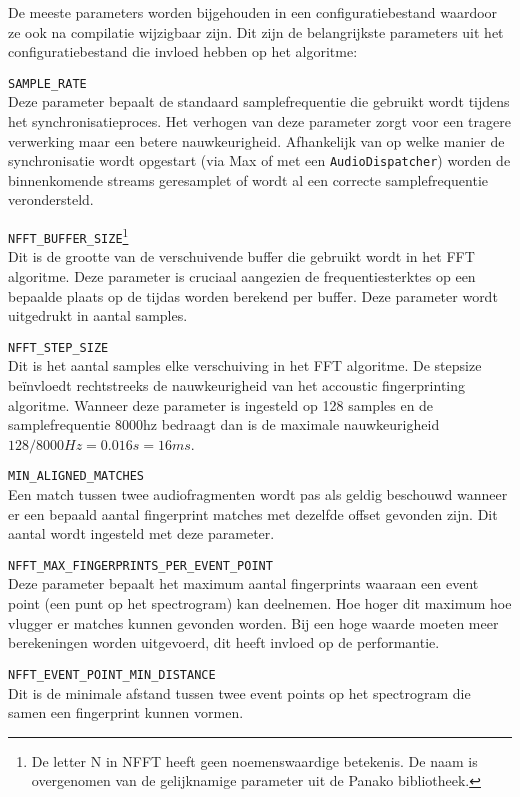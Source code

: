 De meeste parameters worden bijgehouden in een configuratiebestand waardoor ze ook na compilatie wijzigbaar zijn. Dit zijn de belangrijkste parameters uit het configuratiebestand die invloed hebben op het algoritme:

\begin{description}
\item\texttt{SAMPLE\_RATE} \hfill \\
Deze parameter bepaalt de standaard samplefrequentie die gebruikt wordt tijdens het synchronisatieproces. Het verhogen van deze parameter zorgt voor een tragere verwerking maar een betere nauwkeurigheid. Afhankelijk van op welke manier de synchronisatie wordt opgestart (via Max of met een \texttt{AudioDispatcher}) worden de binnenkomende streams geresamplet of wordt al een correcte samplefrequentie verondersteld.

\item\texttt{NFFT\_BUFFER\_SIZE}\footnote{De letter N in NFFT heeft geen noemenswaardige betekenis. De naam is overgenomen van de gelijknamige parameter uit de Panako bibliotheek.} \hfill \\
Dit is de grootte van de verschuivende buffer die gebruikt wordt in het FFT algoritme. Deze parameter is cruciaal aangezien de frequentiesterktes op een bepaalde plaats op de tijd\-as worden berekend per buffer. Deze parameter wordt uitgedrukt in aantal samples.
\item\texttt{NFFT\_STEP\_SIZE} \hfill \\
Dit is het aantal samples elke verschuiving in het FFT algoritme. De stepsize beïnvloedt rechtstreeks de nauwkeurigheid van het accoustic fingerprinting algoritme. Wanneer deze parameter is ingesteld op 128 samples en de samplefrequentie 8000hz bedraagt dan is de maximale nauwkeurigheid $128/8000Hz = 0.016s = 16ms$.
\item\texttt{MIN\_ALIGNED\_MATCHES} \hfill \\
Een match tussen twee audiofragmenten wordt pas als geldig beschouwd wanneer er een bepaald aantal fingerprint matches met dezelfde offset gevonden zijn. Dit aantal wordt ingesteld met deze parameter.
\item\texttt{NFFT\_MAX\_FINGERPRINTS\_PER\_EVENT\_POINT} \hfill \\
Deze parameter bepaalt het maximum aantal fingerprints waaraan een event point (een punt op het spectrogram) kan deelnemen. Hoe hoger dit maximum hoe vlugger er matches kunnen gevonden worden. Bij een hoge waarde moeten meer berekeningen worden uitgevoerd, dit heeft invloed op de performantie.
\item\texttt{NFFT\_EVENT\_POINT\_MIN\_DISTANCE} \hfill \\
Dit is de minimale afstand tussen twee event points op het spectrogram die samen een fingerprint kunnen vormen. 

\end{description}

